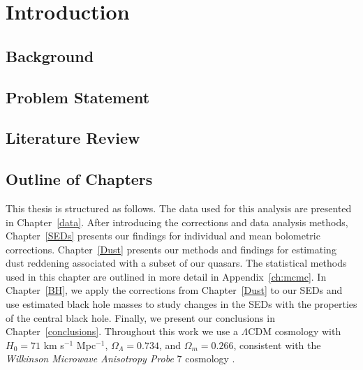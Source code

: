 \chapter{Introduction}


\section{Background} \label{sec:AD}








\section{Problem Statement} \label{sec:dust_intro}

\section{Literature Review} \label{sec:intro_MBH}


\section{Outline of Chapters}

This thesis is structured as follows. The data used for this analysis are presented in Chapter~\ref{data}.  After introducing the corrections and data analysis methods, Chapter~\ref{SEDs} presents our findings for individual and mean bolometric corrections.  Chapter~\ref{Dust} presents our methods and findings for estimating dust reddening associated with a subset of our quasars.  The statistical methods used in this chapter are outlined in more detail in Appendix~\ref{ch:mcmc}. In Chapter~\ref{BH}, we apply the corrections from Chapter~\ref{Dust} to our SEDs and use estimated black hole masses to study changes in the SEDs with the properties of the central black hole. Finally, we present our conclusions in Chapter~\ref{conclusions}. Throughout this work we use a $\Lambda$CDM cosmology with $H_0=71$ km s$^{-1}$ Mpc$^{-1}$, $\Omega_\Lambda = 0.734$, and $\Omega_m = 0.266$, consistent with the {\em Wilkinson Microwave Anisotropy Probe} 7 cosmology \citep{Jarosik:2011}.

